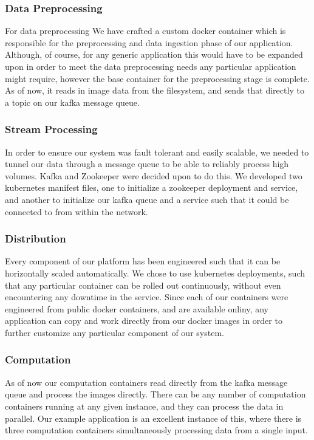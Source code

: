 \documentclass[10pt,journal,compsoc,onecolumn,draftclsnofoot]{IEEEtran}
\begin{document}
\subsubsection{Data Preprocessing}
For data preprocessing We have crafted a custom docker container which is responsible for the preprocessing and data ingestion phase of our application. Although, of course, for any generic application this would have to be expanded upon in order to meet the data preprocessing needs any particular application might require, however the base container for the preprocessing stage is complete. As of now, it reads in image data from the filesystem, and sends that directly to a topic on our kafka message queue.
\subsubsection{Stream Processing}
In order to ensure our system was fault tolerant and easily scalable, we needed to tunnel our data through a message queue to be able to reliably process high volumes. Kafka and Zookeeper were decided upon to do this. We developed two kubernetes manifest files, one to initialize a zookeeper deployment and service, and another to initialize our kafka queue and a service such that it could be connected to from within the network. 
\subsubsection{Distribution}
Every component of our platform has been engineered such that it can be horizontally scaled automatically. We chose to use kubernetes deployments, such that any particular container can be rolled out continuously, without even encountering any downtime in the service. Since each of our containers were engineered from public docker containers, and are available onliny, any application can copy and work directly from our docker images in order to further customize any particular component of our system.
\subsubsection{Computation}
As of now our computation containers read directly from the kafka message queue and process the images directly. There can be any number of computation containers running at any given instance, and they can process the data in parallel. Our example application is an excellent instance of this, where there is three computation containers simultaneously processing data from a single input. 
\end{document}
